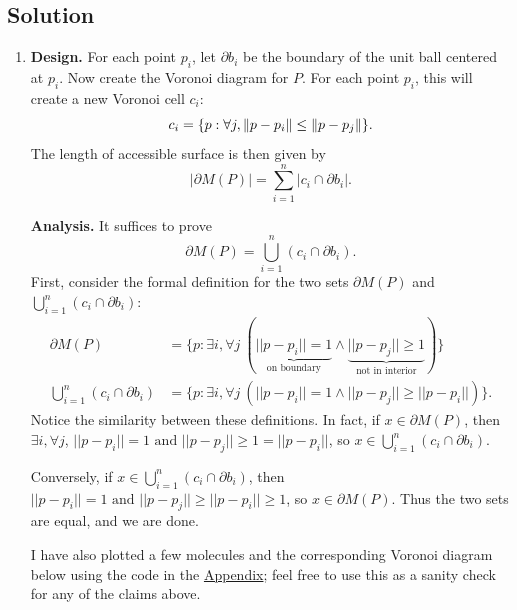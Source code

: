 \documentclass{article}
\DeclarePairedDelimiter\norm{\lVert}{\rVert}%
\begin{document}
\subsection*{Solution}
    \begin{enumerate}
        \item \textbf{Design.} For each point $p_{i}$, let $\partial b_{i}$ be the boundary of the unit ball centered at $p_{i}$. Now create the Voronoi diagram for $P$. For each point $p_{i}$, this will create a new Voronoi cell $c_{i}$: $$c_{i} = \{p : \forall j,  \norm{p - p_{i}} \le \norm{p - p_{j}}\}.$$ The length of accessible surface is then given by $$|\partial M (P)| = \sum_{i = 1}^{n} |c_{i} \cap \partial b_{i}|.$$

        \vspace{3mm}
        \textbf{Analysis.} It suffices to prove $$\partial M (P) = \bigcup_{i = 1}^{n}(c_{i} \cap \partial b_{i}).$$ First, consider the formal definition for the two sets $\partial M (P) $ and $\bigcup_{i = 1}^{n}(c_{i} \cap \partial b_{i})$:
        \begin{align*}
            \partial M (P) &= \{p : \exists i, \forall j\ (\underbrace{||p - p_{i}|| = 1}_{\text{on boundary}} \land \underbrace{||p - p_{j}|| \ge 1}_{\text{not in interior}})\} \\
            \bigcup_{i = 1}^{n}(c_{i} \cap \partial b_{i}) &= \{p : \exists i, \forall j\ (||p - p_{i}|| = 1 \land ||p - p_{j}|| \ge ||p - p_{i}||)\}.
        \end{align*}
        Notice the similarity between these definitions. In fact, if $x \in \partial M (P)$, then $\exists i, \forall j$, $||p - p_{i}|| = 1 \text{ and } ||p - p_{j}|| \ge 1 = ||p - p_{i}|| $, so $x \in \bigcup_{i = 1}^{n}(c_{i} \cap \partial b_{i})$.

        \vspace{2mm}
        Conversely, if $x \in \bigcup_{i = 1}^{n}(c_{i} \cap \partial b_{i})$, then $||p - p_{i}|| = 1 \text{ and } ||p - p_{j}|| \ge ||p - p_{i}|| \ge 1$, so $x \in \partial M (P)$. Thus the two sets are equal, and we are done.

        \vspace{3mm}
        I have also plotted a few molecules and the corresponding Voronoi diagram below using the code in the \hyperref[sec:appendix]{Appendix}; feel free to use this as a sanity check for any of the claims above.


\end{enumerate}
\end{document}
